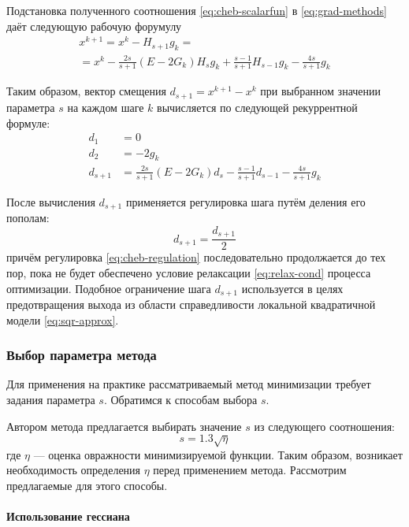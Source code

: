 Подстановка полученного соотношения \eqref{eq:cheb-scalarfun}
в \eqref{eq:grad-methods} даёт следующую рабочую форумулу
\begin{multline}
  x^{k+1} = x^k - H_{s+1}g_k =\\=
  x^k-\frac{2s}{s+1}(E-2G_k)H_sg_k+\frac{s-1}{s+1}H_{s-1}g_k-\frac{4s}{s+1}g_k
\end{multline}

Таким образом, вектор смещения $d_{s+1} = x^{k+1} - x^k$ при выбранном
значении параметра $s$ на каждом шаге $k$ вычисляется по следующей
рекуррентной формуле:
\begin{equation}
  \label{eq:cheb-workhorse}
  \begin{aligned}
    d_1 &= 0\\
    d_2 &= -2g_k \\
    d_{s+1} &=
    \frac{2s}{s+1}(E-2G_k)d_{s}-\frac{s-1}{s+1}d_{s-1}-\frac{4s}{s+1}g_k
  \end{aligned}
\end{equation}

После вычисления $d_{s+1}$ применяется регулировка шага путём деления
его пополам:
\begin{equation}
  \label{eq:cheb-regulation}
  d_{s+1} = \frac{d_{s+1}}{2}
\end{equation}
причём регулировка \eqref{eq:cheb-regulation} последовательно
продолжается до тех пор, пока не будет обеспечено условие релаксации
\eqref{eq:relax-cond} процесса оптимизации. Подобное ограничение шага
$d_{s+1}$ используется в целях предотвращения выхода из области
справедливости локальной квадратичной модели \eqref{eq:sqr-approx}.

\subsubsection{Выбор параметра метода}
\label{sec:cheb-param}

Для применения на практике рассматриваемый метод минимизации требует
задания параметра $s$. Обратимся к способам выбора $s$.

Автором метода предлагается выбирать значение $s$ из следующего
соотношения:
\begin{equation}
  \label{eq:cheb-param}
  s = 1.3 \sqrt{\eta}
\end{equation}
где $\eta$ — оценка овражности минимизируемой функции. Таким образом,
возникает необходимость определения $\eta$ перед применением метода.
Рассмотрим предлагаемые для этого способы.

\paragraph{Использование гессиана}

